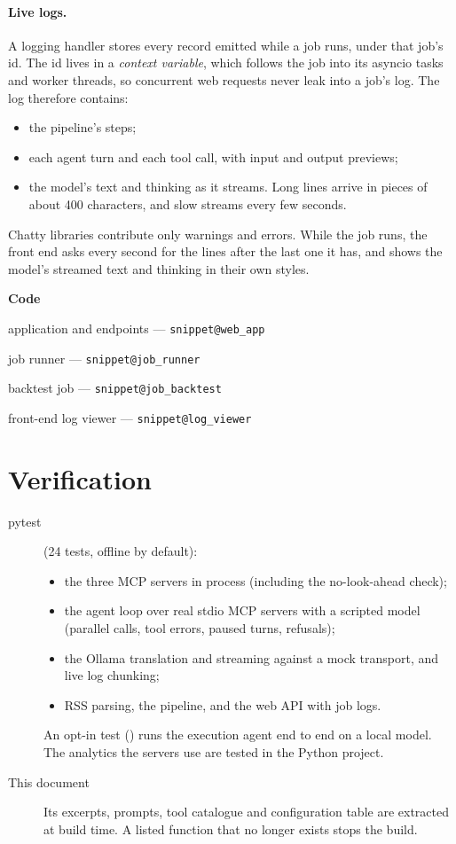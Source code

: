 \documentclass[11pt,a4paper]{article}
\makeatletter
\newcommand{\snippetsource}[1]{\csname snippet@#1\endcsname}
\newcommand{\snippet}[3]{%
  }
\newenvironment{codepointers}{%
  \par\smallskip\begingroup\footnotesize\noindent\textcolor{blue!50!black}{\textbf{Code}}\par\nopagebreak
  \begin{list}{}{\setlength{\leftmargin}{1.2em}\setlength{\itemsep}{0pt}\setlength{\parsep}{0pt}\setlength{\topsep}{1pt}}}%
  {\end{list}\endgroup\smallskip}
\newcommand{\codeitem}[2]{\item #2 --- \texttt{\snippetsource{#1}}}
\makeatother
\begin{document}
\paragraph{Live logs.} A logging handler stores every record emitted while a job runs,
under that job's id. The id lives in a \emph{context variable}, which follows the job into
its asyncio tasks and worker threads, so concurrent web requests never leak into a job's
log. The log therefore contains:
\begin{itemize}
  \item the pipeline's steps;
  \item each agent turn and each tool call, with input and output previews;
  \item the model's text and thinking as it streams. Long lines arrive in pieces of about
        400 characters, and slow streams every few seconds.
\end{itemize}
Chatty libraries contribute only warnings and errors. While the job runs, the front end
asks every second for the lines after the last one it has, and shows the model's streamed
text and thinking in their own styles.
\snippet{job_log_handler}{Python}{Per-job log capture}
\snippet{job_run}{Python}{Running a job with its log context}
\begin{codepointers}
  \codeitem{web_app}{application and endpoints}
  \codeitem{job_runner}{job runner}
  \codeitem{job_backtest}{backtest job}
  \codeitem{log_viewer}{front-end log viewer}
\end{codepointers}


\section{Verification}\label{sec:verification}
\begin{description}
  \item[pytest] (24 tests, offline by default):
        \begin{itemize}
          \item the three MCP servers in process (including the no-look-ahead check);
          \item the agent loop over real stdio MCP servers with a scripted model (parallel
                calls, tool errors, paused turns, refusals);
          \item the Ollama translation and streaming against a mock transport, and live
                log chunking;
          \item RSS parsing, the pipeline, and the web API with job logs.
        \end{itemize}
        An opt-in test () runs the execution agent end to end on a
        local model. The analytics the servers use are tested in the Python project.
  \item[This document] Its excerpts, prompts, tool catalogue and configuration table are
        extracted at build time. A listed function that no longer exists stops the build.
\end{description}
\end{document}
